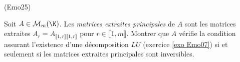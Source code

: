 \begin{tiny}(Emo25)\end{tiny} Soit $A \in \mathcal{M}_m(\K)$.\label{exo Emo25} Les \emph{matrices extraites principales} de $A$ sont les matrices extraites $A_r = A_{\llbracket 1,r\rrbracket \llbracket 1,r\rrbracket}$ pour $r\in \llbracket 1,m \rrbracket$.\newline
Montrer que $A$ vérifie la condition assurant l'existence d'une décomposition $LU$ (exercice \ref{exo Emo07}) si et seulement si les matrices extraites principales sont inversibles.